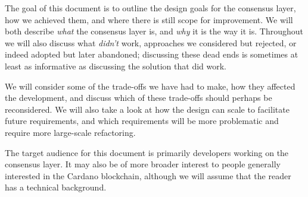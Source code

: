 The goal of this document is to outline the design goals for the consensus
layer, how we achieved them, and where there is still scope for improvement. We
will both describe \emph{what} the consensus layer is, and \emph{why} it is the
way it is. Throughout we will also discuss what \emph{didn't} work, approaches
we considered but rejected, or indeed adopted but later abandoned; discussing
these dead ends is sometimes at least as informative as discussing the solution
that did work.

We will consider some of the trade-offs we have had to make, how they
affected the development, and discuss which of these trade-offs should perhaps
be reconsidered. We will also take a look at how the design can scale to
facilitate future requirements, and which requirements will be more problematic
and require more large-scale refactoring.

The target audience for this document is primarily developers working on the
consensus layer. It may also be of more broader interest to people generally
interested in the Cardano blockchain, although we will assume that the
reader has a technical background.
